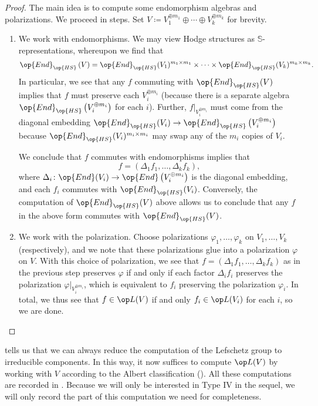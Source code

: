 \documentclass[../thesis.tex]{subfiles}
\begin{document}
\begin{proof}
	The main idea is to compute some endomorphism algebras and polarizations. We proceed in steps. Set $V\coloneqq V_1^{\oplus m_1}\oplus\cdots\oplus V_k^{\oplus m_k}$ for brevity.
	\begin{enumerate}
		\item We work with endomorphisms. We may view Hodge structures as $\mathbb S$-representations, whereupon we find that
		\[\op{End}_{\op{HS}}\left(V\right)=\op{End}_{\op{HS}}(V_1)^{m_1\times m_1}\times\cdots\times\op{End}_{\op{HS}}(V_k)^{m_k\times m_k}.\]
		In particular, we see that any $f$ commuting with $\op{End}_{\op{HS}}(V)$ implies that $f$ must preserve each $V_i^{\oplus m_i}$ (because there is a separate algebra $\op{End}_{\op{HS}}\left(V_i^{\oplus m_i}\right)$ for each $i$). Further, $f|_{V_i^{\oplus m_i}}$ must come from the diagonal embedding $\op{End}_{\op{HS}}(V_i)\to\op{End}_{\op{HS}}\left(V_i^{\oplus m_i}\right)$ because $\op{End}_{\op{HS}}(V_i)^{m_i\times m_i}$ may swap any of the $m_i$ copies of $V_i$.
		
		We conclude that $f$ commutes with endomorphisms implies that
		\[f=(\Delta_1f_1,\ldots,\Delta_kf_k),\]
		where $\Delta_i\colon\op{End}(V_i)\to\op{End}\left(V_i^{\oplus m_i}\right)$ is the diagonal embedding, and each $f_i$ commutes with $\op{End}_{\op{HS}}(V_i)$. Conversely, the computation of $\op{End}_{\op{HS}}(V)$ above allows us to conclude that any $f$ in the above form commutes with $\op{End}_{\op{HS}}(V)$.

		\item We work with the polarization. Choose polarizations $\varphi_1,\ldots,\varphi_k$ on $V_1,\ldots,V_k$ (respectively), and we note that these polarizations glue into a polarization $\varphi$ on $V$. With this choice of polarization, we see that $f=(\Delta_1f_1,\ldots,\Delta_kf_k)$ as in the previous step preserves $\varphi$ if and only if each factor $\Delta_if_i$ preserves the polarization $\varphi|_{V_i^{\oplus m_i}}$, which is equivalent to $f_i$ preserving the polarization $\varphi_i$. In total, we thus see that $f\in\op L(V)$ if and only $f_i\in\op L(V_i)$ for each $i$, so we are done.
		\qedhere
	\end{enumerate}
\end{proof}
 tells us that we can always reduce the computation of the Lefschetz group to irreducible components. In this way, it now suffices to compute $\op L(V)$ by working with $V$ according to the Albert classification (). All these computations are recorded in \cite[Section~2]{milne-lefschetz-group}. Because we will only be interested in Type IV in the sequel, we will only record the part of this computation we need for completeness.
\end{document}

